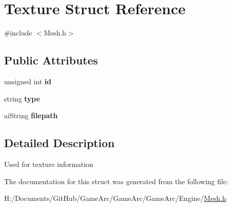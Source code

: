 \hypertarget{struct_texture}{\section{Texture Struct Reference}
\label{struct_texture}
}


{\ttfamily \#include $<$Mesh.\+h$>$}

\subsection*{Public Attributes}
\begin{DoxyCompactItemize}
\item 
\hypertarget{struct_texture_aed42161a5c00b6020c85833401da6da6}{unsigned int {\bfseries id}}\label{struct_texture_aed42161a5c00b6020c85833401da6da6}

\item 
\hypertarget{struct_texture_adacb495ed5140ec76a09cd130e7d5c32}{string {\bfseries type}}\label{struct_texture_adacb495ed5140ec76a09cd130e7d5c32}

\item 
\hypertarget{struct_texture_a69c8def64c608063b2ecb7fd785121ee}{ai\+String {\bfseries filepath}}\label{struct_texture_a69c8def64c608063b2ecb7fd785121ee}

\end{DoxyCompactItemize}


\subsection{Detailed Description}
Used for texture information 

The documentation for this struct was generated from the following file\+:\begin{DoxyCompactItemize}
\item 
H\+:/\+Documents/\+Git\+Hub/\+Game\+Arc/\+Game\+Arc/\+Game\+Arc/\+Engine/\hyperlink{_mesh_8h}{Mesh.\+h}\end{DoxyCompactItemize}
